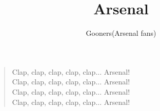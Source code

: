 \documentclass[a4paper,12pt]{article}
\title{Arsenal}
\author{Gooners(Arsenal fans)}
\date{}
\begin{document}
	
	\maketitle
	
	\begin{verse}
		
		Clap, clap, clap, clap, clap$\ldots$ Arsenal! \\
		Clap, clap, clap, clap, clap$\ldots$ Arsenal! \\
		Clap, clap, clap, clap, clap$\ldots$ Arsenal! \\
		Clap, clap, clap, clap, clap$\ldots$ Arsenal!
		
	\end{verse}
	
\end{document}
